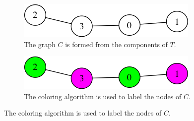\begin{figure}
\begin{subfigure}{0.3\textwidth}
\includegraphics[width=\linewidth]{images/mani/2-components.png}
\caption{The graph $C$ is formed from the components of $T$.} \label{fig:mani2}
\end{subfigure}
\hspace*{2cm} %
\begin{subfigure}{0.3\textwidth}
\includegraphics[width=\linewidth]{images/mani/3-colored-components.png}
\caption{The coloring algorithm is used to label the nodes of $C$.} \label{fig:mani3}
\end{subfigure}

\vspace{1cm} %


\end{figure}
